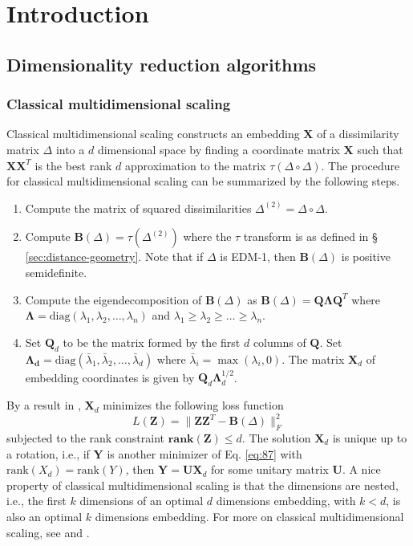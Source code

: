 \chapter{Introduction}
\label{cha:introduction}

\section{Dimensionality reduction algorithms}

\subsection{Classical multidimensional scaling}
\label{sec:classical-mds}
Classical multidimensional scaling \citep{torgesen52:_multid}
constructs an embedding $\mathbf{X}$ of a dissimilarity matrix
$\Delta$ into a $d$ dimensional space by finding a coordinate matrix
$\mathbf{X}$ such that $\mathbf{X}\mathbf{X}^{T}$ is the best rank $d$
approximation to the matrix $\tau(\Delta \circ \Delta)$. The procedure
for classical multidimensional scaling can be summarized by the
following steps.
\begin{enumerate}
\item Compute the matrix of squared dissimilarities $\Delta^{(2)} =
  \Delta \circ \Delta$.
\item Compute $\mathbf{B}(\Delta) = \tau(\Delta^{(2)})$ where the
  $\tau$ transform is as defined in \S
  \ref{sec:distance-geometry}. Note that if $\Delta$ is EDM-1, then
  $\mathbf{B}(\Delta)$ is positive semidefinite. 
\item Compute the eigendecomposition of $\mathbf{B}(\Delta)$ as
  $\mathbf{B}(\Delta) = \mathbf{Q} \bm{\Lambda} \mathbf{Q}^{T}$ where
  $\bm{\Lambda} = \mathrm{diag}(\lambda_1, \lambda_2, \dots,
  \lambda_n)$ and $\lambda_1 \geq \lambda_2 \geq \dots \geq
  \lambda_n$.  
\item Set $\mathbf{Q}_d$ to be the matrix formed by the first $d$
  columns of $\mathbf{Q}$. Set $\bm{\Lambda_{d}} =
  \mathrm{diag}(\bar{\lambda}_1,\bar{\lambda}_2, \dots,
  \bar{\lambda}_d)$ where $\bar{\lambda}_i = \max(\lambda_i, 0)$. The
  matrix $\mathbf{X}_d$ of embedding coordinates is given by
  $\mathbf{Q}_d \mathbf{\Lambda}_{d}^{1/2}$.
\end{enumerate}
By a result in \citet{eckart36:_approx}, $\mathbf{X}_d$ minimizes the
following loss function
\begin{equation}
  \label{eq:87}
 L(\mathbf{Z}) = \| \mathbf{Z} \mathbf{Z}^{T} - \mathbf{B}(\Delta)
 \|_F^{2} 
\end{equation}
subjected to the rank constraint $\mathbf{rank}(\mathbf{Z}) \leq
d$. The solution $\mathbf{X}_d$ is unique up to a rotation, i.e., if
$\mathbf{Y}$ is another minimizer of Eq. \eqref{eq:87} with
$\mathrm{rank}(X_d) = \mathrm{rank}(Y)$, then $\mathbf{Y} =
\mathbf{U}\mathbf{X}_d$ for some unitary matrix $\mathbf{U}$. A nice
property of classical multidimensional scaling is that the dimensions
are nested, i.e., the first $k$ dimensions of an optimal $d$
dimensions embedding, with $k < d$, is also an optimal $k$ dimensions
embedding. For more on classical multidimensional scaling, see
\citet{borg05:_moder} and \citet{gower66:_some}.
